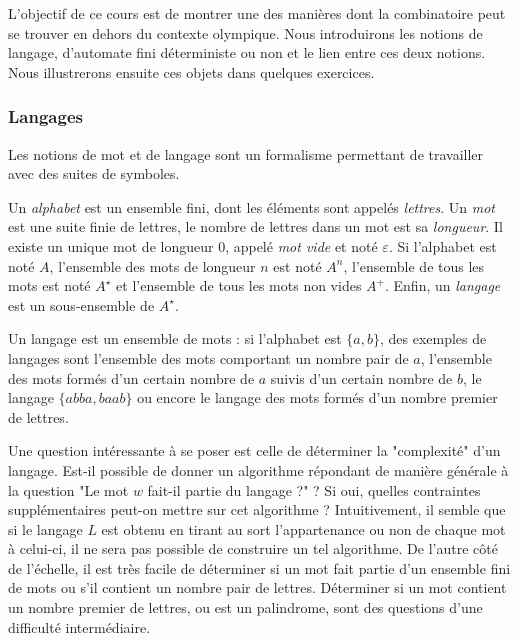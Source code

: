 L'objectif de ce cours est de montrer une des manières dont la combinatoire peut se trouver en dehors du contexte olympique. Nous introduirons les notions de langage, d'automate fini déterministe ou non et le lien entre ces deux notions. Nous illustrerons ensuite ces objets dans quelques exercices.

\subsubsection{Langages}
Les notions de mot et de langage sont un formalisme permettant de travailler avec des suites de symboles.

\begin{dfn}
Un \emph{alphabet} est un ensemble fini, dont les éléments sont appelés \emph{lettres}. Un \emph{mot} est une suite finie de lettres, le nombre de lettres dans un mot est sa \emph{longueur}. Il existe un unique mot de longueur 0, appelé \emph{mot vide} et noté $\varepsilon$. Si l'alphabet est noté $A$, l'ensemble des mots de longueur $n$ est noté $A^n$, l'ensemble de tous les mots est noté $A^\star$ et l'ensemble de tous les mots non vides $A^+$. Enfin, un \emph{langage} est un sous-ensemble de $A^\star$.
\end{dfn}

Un langage est un ensemble de mots : si l'alphabet est $\{a, b\}$, des exemples de langages sont l'ensemble des mots comportant un nombre pair de $a$, l'ensemble des mots formés d'un certain nombre de $a$ suivis d'un certain nombre de $b$, le langage $\{abba, baab\}$ ou encore le langage des mots formés d'un nombre premier de lettres.

Une question intéressante à se poser est celle de déterminer la "complexité" d'un langage. Est-il possible de donner un algorithme répondant de manière générale à la question "Le mot $w$ fait-il partie du langage ?" ? Si oui, quelles contraintes supplémentaires peut-on mettre sur cet algorithme ? Intuitivement, il semble que si le langage $L$ est obtenu en tirant au sort l'appartenance ou non de chaque mot à celui-ci, il ne sera pas possible de construire un tel algorithme. De l'autre côté de l'échelle, il est très facile de déterminer si un mot fait partie d'un ensemble fini de mots ou s'il contient un nombre pair de lettres. Déterminer si un mot contient un nombre premier de lettres, ou est un palindrome, sont des questions d'une difficulté intermédiaire.

